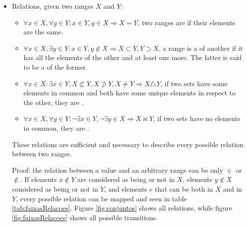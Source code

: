 \begin{itemize}
	\item Relations, given two ranges $X$ and $Y$:
		\begin{itemize}
			\item $\forall x \in X, \forall y \in Y: x \in Y, y \in X \Rightarrow X = Y$,
				two ranges are  if their elements are the same.
			\item $\forall x \in X, \exists y \in Y: x \in Y, y \notin X \Rightarrow X \subset Y, Y \supset X$, 
				a range is a  of another if it has all the
				elements of the other and at least one more. The latter is
				said to be a  of the former.
			\item $\forall x \in X: \exists x \in Y, X \not\subset Y, X \not\supset Y, X \neq Y \Rightarrow X \triangle Y$,
				if two sets have some elements in common and both have some
				unique elements in respect to the other, they are
				.
			\item $\forall x \in X, \forall y \in Y: \lnot\exists x \in Y, \lnot\exists y \in X \Rightarrow X \bowtie Y$,
				if two sets have no elements in common, they are
				.
		\end{itemize}
		These relations are sufficient and necessary to describe every possible
		relation between two ranges.

		Proof: the relation between a value and an arbitrary range can be only
		$\in$ or $\not\in$. If elements $x \not\in Y$ are considered as being or
		not in $X$, elements $y \not\in X$ considered as being or not in $Y$,
		and elements $e$ that can be both in $X$ and in $Y$, every possible
		relation can be mapped and seen in table \ref{tab:faixasRelacoes}.
		Figure \ref{fig:conjuntos} shows all relations, while figure
		\ref{fig:faixasRelacoes} shows all possible transitions.


\end{itemize}
